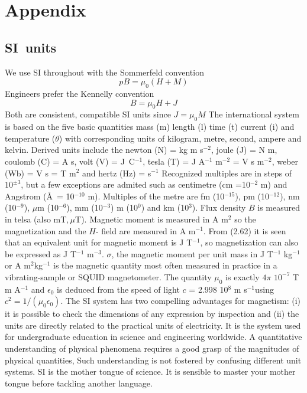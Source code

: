 \chapter*{Appendix}

\section{SI\ units%
}
We use SI throughout with the Sommerfeld convention%
\begin{equation}
{p}{B}=\mu _{0}({H}+{M})  
\end{equation}%
Engineers prefer the Kennelly convention%
\begin{equation}
{B}=\mu _{0}{H}+{J}  
\end{equation}%
Both are consistent, compatible SI units since ${J}\mathbf{=}\mu
_{0}{M}$
The international system is based on the five basic quantities mass (m)
length (l) time (t) current (i) and temperature ($\theta $) with
corresponding units of kilogram, metre, second, ampere and kelvin. Derived
units include the newton (N) = kg m s$^{-2}$, joule (J) = N m, coulomb (C) =
A s, volt (V) = J\ C$^{-1}$, tesla (T) = J A$^{-1}$ m$^{-2}$ = V s m$^{-2}$,
weber (Wb) = V s = T m$^{2}$ and hertz (Hz) = s$^{-1}$
Recognized multiples are in steps of $10^{\pm 3}$, but a few exceptions are
admited such as centimetre (cm =10$^{-2}$ m) and Angstrom (\AA\ = 10$^{-10}$
m). Multiples of the metre are fm (10$^{-15}$), pm (10$^{-12}$), nm (10$%
^{-9} $), $%
{\mu}%
$m (10$^{-6}$), mm (10$^{-3}$) m (10$^{0}$) and km (10$^{3}$).
Flux density $B$ is measured in telsa (also mT$,%
{\mu}%
$T). Magnetic moment is measured in A m$^{2}$ so the magnetization and the $%
H $- field are measured in A m$^{-1}$. From (2.62) it is seen that an
equivalent unit for magnetic moment is J T$^{-1}$, so magnetization can also
be expressed as J T$^{-1}$ m$^{-3}$. $\sigma $, the magnetic moment per unit
mass in J T$^{-1}$ kg$^{-1}$ or A m$^{2%
{ }}$kg$^{-1}$ is the magnetic quantity most often measured in practice
in a vibrating-sample or SQUID magnetometer. The quantity $\mu _{0}$ is
exactly $4\pi $ $10^{-7}$ T m A$^{-1}$ and $\epsilon _{0}$ is deduced from
the speed of light $c$ = 2.998 10$^{8}$ m s$^{-1}$using $c^{2}=1/(\mu
_{0}\epsilon _{0}).$
The SI system has two compelling advantages for magnetism: (i) it is
possible to check the dimensions of any expression by inspection and (ii)
the units are directly related to the practical units of electricity. It is
the system used for undergraduate education in science and engineering
worldwide. A quantitative understanding of physical phenomena requires a
good grasp of the magnitudes of physical quantities, Such understanding is
not fostered by confusing different unit systems. SI is the mother tongue of
science. It is sensible to master your mother tongue before tackling another
language.
